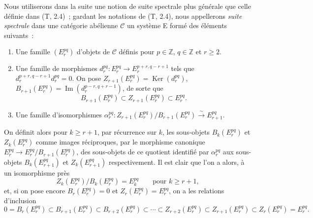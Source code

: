 \begin{env}[11.1.1]
\label{0.11.1.1-fr}
Nous utiliserons dans la suite une notion de suite spectrale plus générale que
celle définie dans (T, 2.4)~; gardant les notations de (T, 2.4), nous
appellerons \emph{suite spectrale} dans une catégorie abélienne $\mathcal C$ un
système E formé des éléments suivants~:
\begin{enumerate}
  \item[(a)] Une famille $(E_r^{pq})$ d'objets de $\mathcal C$ définis pour
    $p\in\mathbb Z$, $q\in\mathbb Z$ et $r\geq2$.
  \item[(b)] Une famille de morphismes
    $d_r^{pq}:E_r^{pq}\to E_r^{p+r,q-r+1}$ tels que
    $d_r^{p+r,q-r+1}d_r^{pq}=0$. On pose
    $Z_{r+1}(E_r^{pq})=\operatorname{Ker}(d_r^{pq})$,
    $B_{r+1}(E_r^{pq})=\operatorname{Im}(d_r^{p-r,q+r-1})$, de sorte que
    \[
      B_{r+1}(E_r^{pq})\subset Z_{r+1}(E_r^{pq})\subset E_r^{pq}.
    \]
  \item[(c)] Une famille d'isomorphismes
    $\alpha_r^{pq}:Z_{r+1}(E_r^{pq})/B_{r+1}(E_r^{pq})
    \xrightarrow{\sim}E_{r+1}^{pq}$.
\end{enumerate}

On définit alors pour $k\geq r+1$, par récurrence sur $k$, les sous-objets
$B_k(E_r^{pq})$ et $Z_k(E_r^{pq})$ comme images réciproques, par le morphisme
canonique $E_r^{pq}\to E_r^{pq}/B_{r+1}(E_r^{pq})$, des sous-objets de ce
quotient identifié par $\alpha_r^{pq}$ aux sous-objets $B_k(E_{r+1}^{pq})$ et
$Z_k(E_{r+1}^{pq})$ respectivement. Il est clair que l'on a alors, à un
isomorphisme près
\[
\label{0.11.1.1.1-fr}
  Z_k(E_r^{pq})/B_k(E_r^{pq})=E_k^{pq}
  \qquad\text{pour }k\geq r+1,
  \tag{11.1.1.1}
\]
et, si on pose encore $B_r(E_r^{pq})=0$ et $Z_r(E_r^{pq})=E_r^{pq}$, on a
les relations d'inclusion
\[
\label{0.11.1.1.2-fr}
  0=B_r(E_r^{pq})\subset B_{r+1}(E_r^{pq})\subset B_{r+2}(E_r^{pq})
  \subset\cdots\subset Z_{r+2}(E_r^{pq})\subset Z_{r+1}(E_r^{pq})
  \subset Z_r(E_r^{pq})=E_r^{pq}.
  \tag{11.1.1.2}
\]


\end{env}
